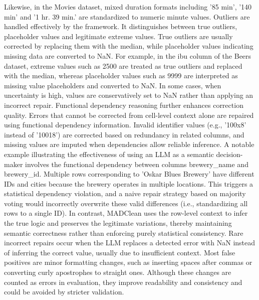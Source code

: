 Likewise, in the Movies dataset, mixed duration formats including '85 min', '140 min' and '1 hr. 39 min.' are standardized to numeric minute values.
\newline\newline
Outliers are handled effectively by the framework. 
It distinguishes between true outliers, placeholder values and legitimate extreme values. 
True outliers are usually corrected by replacing them with the median, while placeholder values indicating missing data are converted to NaN. 
For example, in the ibu column of the Beers dataset, extreme values such as 2500 are treated as true outliers and replaced with the median, whereas placeholder values such as 9999 are interpreted as missing value placeholders and converted to NaN.
In some cases, when uncertainty is high, values are conservatively set to NaN rather than applying an incorrect repair.
\newline\newline
Functional dependency reasoning further enhances correction quality. 
Errors that cannot be corrected from cell-level context alone are repaired using functional dependency information. 
Invalid identifier values (e.g., '100x8' instead of '10018') are corrected based on redundancy in related columns, and missing values are imputed when dependencies allow reliable inference. 
A notable example illustrating the effectiveness of using an LLM as a semantic decision-maker involves the functional dependency between columns brewery\_name and brewery\_id. 
Multiple rows corresponding to 'Oskar Blues Brewery' have different IDs and cities because the brewery operates in multiple locations. 
This triggers a statistical dependency violation, and a naive repair strategy based on majority voting would incorrectly overwrite these valid differences (i.e., standardizing all rows to a single ID). 
In contrast, MADClean uses the row-level context to infer the true logic and preserves the legitimate variations, thereby maintaining semantic correctness rather than enforcing purely statistical consistency.
\newline\newline
Rare incorrect repairs occur when the LLM replaces a detected error with NaN instead of inferring the correct value, usually due to insufficient context. 
Most false positives are minor formatting changes, such as inserting spaces after commas or converting curly apostrophes to straight ones. 
Although these changes are counted as errors in evaluation, they improve readability and consistency and could be avoided by stricter validation. 
